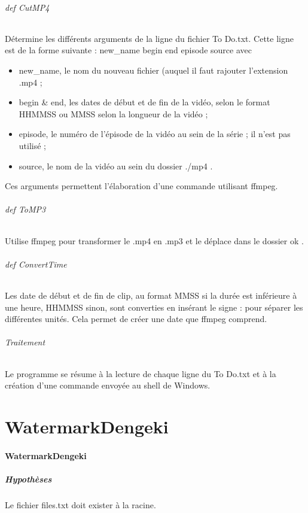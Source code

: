 \documentclass[a4paper,12pt]{article}
\begin{document}
\paragraph{def CutMP4}
Détermine les différents arguments de la ligne du fichier To \og Do.txt\fg. Cette ligne est de la forme suivante : \og new\_name begin end episode source \fg{}avec
\begin{itemize}
\item new\_name, le nom du nouveau fichier (auquel il faut rajouter l'extension .mp4 ;
\item begin \& end, les dates de début et de fin de la vidéo, selon le format HHMMSS ou MMSS selon la longueur de la vidéo ;
\item episode, le numéro de l'épisode de la vidéo au sein de la série ; il n'est pas utilisé ;
\item source, le nom de la vidéo au sein du dossier \og ./mp4 \fg{}. 
\end{itemize} 
Ces arguments permettent l'élaboration d'une commande utilisant ffmpeg.
\paragraph{def ToMP3}
Utilise ffmpeg pour transformer le .mp4 en .mp3 et le déplace dans le dossier \og ok \fg. 
\paragraph{def ConvertTime}
Les date de début et de fin de clip, au format MMSS si la durée est inférieure à une heure, HHMMSS sinon, sont converties en insérant le signe \og : \fg{} pour séparer les différentes unités. Cela permet de créer une date que ffmpeg comprend. 
\paragraph{Traitement}
Le programme se résume à la lecture de chaque ligne du To Do.txt et à la création d'une commande envoyée au shell de Windows.

\part{WatermarkDengeki}
\subsection{WatermarkDengeki}
\subsubsection{Hypothèses}
Le fichier files.txt doit exister à la racine. 
\end{document}
